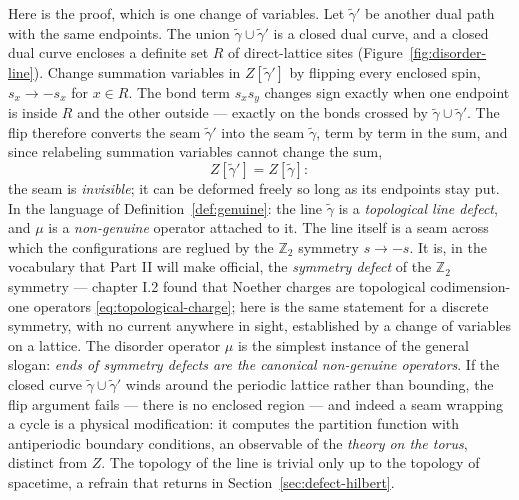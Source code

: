 Here is the proof, which is one change of variables. Let $\tilde\gamma'$
be another dual path with the same endpoints. The union
$\tilde\gamma \cup \tilde\gamma'$ is a closed dual curve, and a closed
dual curve encloses a definite set $R$ of direct-lattice sites
(Figure~\ref{fig:disorder-line}). Change summation variables in
$Z[\tilde\gamma']$ by flipping every enclosed spin, $s_x \to -s_x$ for $x
\in R$. The bond term $s_x s_y$ changes sign exactly when one endpoint
is inside $R$ and the other outside --- exactly on the bonds crossed by
$\tilde\gamma \cup \tilde\gamma'$. The flip therefore converts the seam
$\tilde\gamma'$ into the seam $\tilde\gamma$, term by term in the sum,
and since relabeling summation variables cannot change the sum,
\begin{equation}
Z[\tilde\gamma'] = Z[\tilde\gamma]:
\label{eq:path-independence}
\end{equation}
the seam is \emph{invisible}; it can be deformed freely so long as its
endpoints stay put. In the language of
Definition~\ref{def:genuine}: the line $\tilde\gamma$ is a
\emph{topological line defect}, and $\mu$ is a \emph{non-genuine}
operator attached to it. The line itself is a seam
across which the configurations are reglued by the $\mathbb{Z}_2$ symmetry $s \to
-s$. It is, in the vocabulary that Part II will make official, the
\emph{symmetry defect} of the $\mathbb{Z}_2$ symmetry --- chapter I.2 found that
Noether charges are topological codimension-one operators
\eqref{eq:topological-charge}; here is the same statement for a discrete
symmetry, with no current anywhere in sight, established by a
change of variables on a lattice. The disorder operator $\mu$ is the
simplest instance of the general slogan: \emph{ends of symmetry defects
are the canonical non-genuine operators}. If the closed curve
$\tilde\gamma\cup\tilde\gamma'$ winds around the periodic lattice rather
than bounding, the flip argument fails --- there is no enclosed region
--- and indeed a seam wrapping a cycle is a physical modification: it
computes the partition function with antiperiodic boundary conditions,
an observable of the \emph{theory on the torus}, distinct from $Z$. The
topology of the line is trivial only up to the topology of spacetime,
a refrain that returns in Section~\ref{sec:defect-hilbert}.

